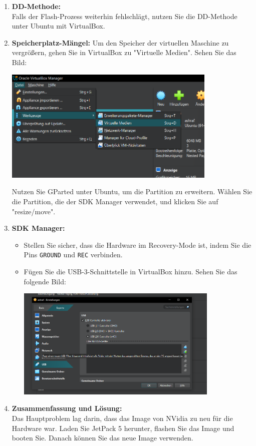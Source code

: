 \documentclass{article}
\begin{document}
\begin{enumerate}
    \item \textbf{DD-Methode:}\\
    Falls der Flash-Prozess weiterhin fehlschlägt, nutzen Sie die DD-Methode unter Ubuntu mit VirtualBox.
    \par \bigskip

    \item \textbf{Speicherplatz-Mängel:}
    Um den Speicher der virtuellen Maschine zu vergrößern, gehen Sie in VirtualBox zu "Virtuelle Medien". Sehen Sie das Bild:
    \par \bigskip

    \includegraphics[width=0.8\textwidth]{Errors_Images/VirtuelleMedien.png}

    Nutzen Sie GParted unter Ubuntu, um die Partition zu erweitern. Wählen Sie die Partition, die der SDK Manager verwendet, und klicken Sie auf "resize/move".
    \par \bigskip

    \item \textbf{SDK Manager:}
    \begin{itemize}
        \item Stellen Sie sicher, dass die Hardware im Recovery-Mode ist, indem Sie die Pins \texttt{GROUND} und \texttt{REC} verbinden.
        \item Fügen Sie die USB-3-Schnittstelle in VirtualBox hinzu. Sehen Sie das folgende Bild: 
        \par \bigskip
        \includegraphics[width=0.8\textwidth]{Errors_Images/Adding_USB.png}
        
    \end{itemize}

    \item \textbf{Zusammenfassung und Lösung:}\\
    Das Hauptproblem lag darin, dass das Image von NVidia zu neu für die Hardware war. Laden Sie JetPack 5 herunter, flashen Sie das Image und booten Sie. Danach können Sie das neue Image verwenden.
    \par \bigskip

\end{enumerate}
\end{document}
